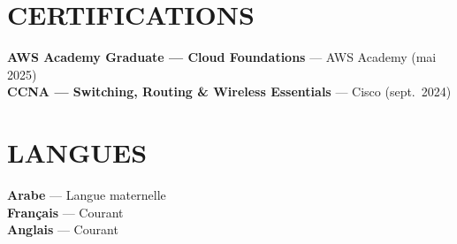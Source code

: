 \documentclass[10pt,a4paper]{article}
\begin{document}
\vspace{1pt}
\begin{minipage}[t]{0.70\textwidth}
\section{CERTIFICATIONS}
{\small
\textbf{\color{primary}AWS Academy Graduate — Cloud Foundations} — AWS Academy (mai 2025)\\[1pt]
\textbf{\color{primary}CCNA — Switching, Routing \& Wireless Essentials} — Cisco (sept.\ 2024)
}
\end{minipage}%
\hfill
\begin{minipage}[t]{0.26\textwidth}
\section{LANGUES}
{\small\textbf{Arabe} — Langue maternelle}\\[1pt]
{\small\textbf{Français} — Courant}\\[1pt]
{\small\textbf{Anglais} — Courant}
\end{minipage}
\end{document}
